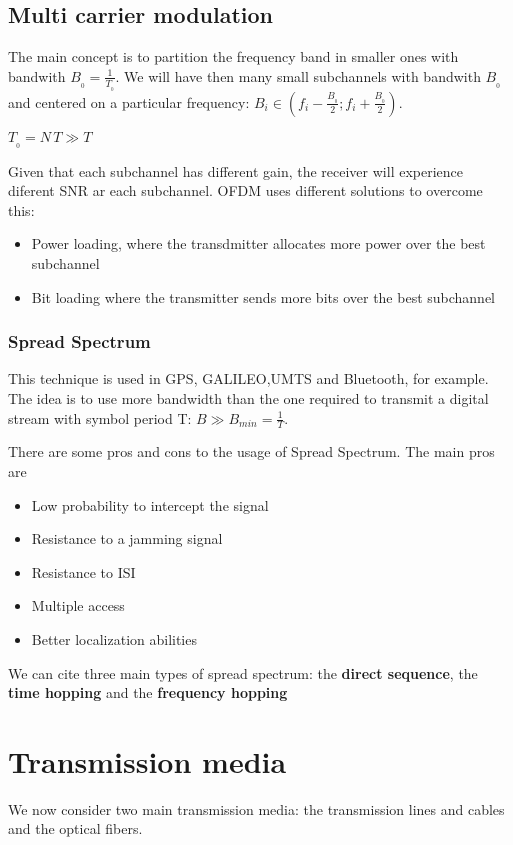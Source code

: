 \subsection{Multi carrier modulation}
The main concept is to partition the frequency band in smaller ones with bandwith $B_{_0}=\frac{1}{T_{_0}}$. We will have then many small subchannels with bandwith $B_{_0}$ and centered on a particular frequency: $B_i \in \left(f_i - \frac{B_{_0}}{2};f_i + \frac{B_{_0}}{2}\right)$.

\begin{figure} \centering
  
  \caption{}
  \label{}
\end{figure}


$T_{_0}=N\,T \gg T$

Given that each subchannel has different gain, the receiver will experience diferent SNR ar each subchannel. OFDM uses different solutions to overcome this:
\begin{itemize}
  \item Power loading, where the transdmitter allocates more power over the best subchannel
  \item Bit loading where the transmitter sends more bits over the best subchannel
\end{itemize}

\subsubsection{Spread Spectrum}
This technique is used in GPS, GALILEO,UMTS and Bluetooth, for example. The idea is to use more bandwidth than the one required to transmit a digital stream with symbol period T: $B \gg B_{min}=\frac{1}{T}$.

There are some pros and cons to the usage of Spread Spectrum. The main pros are
\begin{itemize}
  \item Low probability to intercept the signal
  \item Resistance to a jamming signal
  \item Resistance to ISI
  \item Multiple access
  \item Better localization abilities
\end{itemize}
We can cite three main types of spread spectrum: the \textbf{direct sequence}, the \textbf{time hopping} and the \textbf{frequency hopping}

\section{Transmission media}
We now consider two main transmission media: the transmission lines and cables and the optical fibers.

